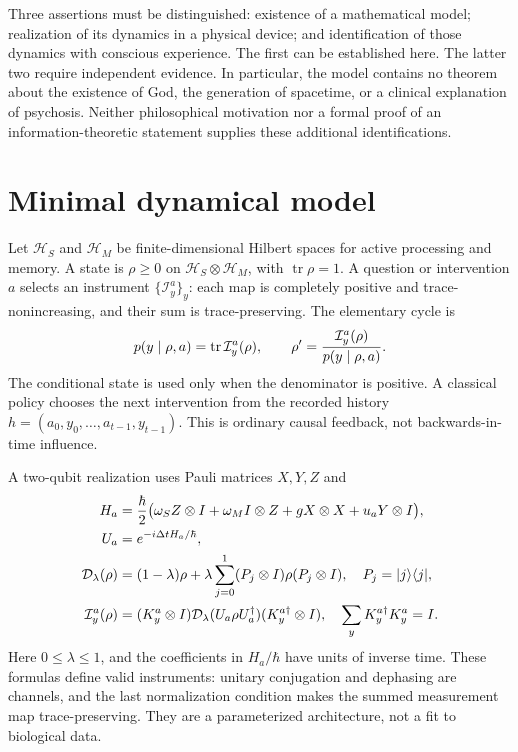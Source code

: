 \documentclass[11pt,a4paper]{article}
\theoremstyle{definition}
\newcommand{\tr}{\operatorname{tr}}
\newcommand{\ket}[1]{|#1\rangle}
\newcommand{\bra}[1]{\langle#1|}
\begin{document}
Three assertions must be distinguished: existence of a mathematical model; realization of its dynamics in a physical device; and identification of those dynamics with conscious experience. The first can be established here. The latter two require independent evidence. In particular, the model contains no theorem about the existence of God, the generation of spacetime, or a clinical explanation of psychosis. Neither philosophical motivation nor a formal proof of an information-theoretic statement supplies these additional identifications.

\section{Minimal dynamical model}
Let $\mathcal H_S$ and $\mathcal H_M$ be finite-dimensional Hilbert spaces for active processing and memory. A state is $\rho\ge0$ on $\mathcal H_S\otimes\mathcal H_M$, with $\tr\rho=1$. A question or intervention $a$ selects an instrument $\{\mathcal I_y^a\}_y$: each map is completely positive and trace-nonincreasing, and their sum is trace-preserving. The elementary cycle is
\begin{equation}\label{eq:cycle}
 p(y\mid\rho,a)=\tr\mathcal I_y^a(\rho),\qquad
 \rho'={\mathcal I_y^a(\rho)\over p(y\mid\rho,a)}.
\end{equation}
The conditional state is used only when the denominator is positive. A classical policy chooses the next intervention from the recorded history $h=(a_0,y_0,\ldots,a_{t-1},y_{t-1})$. This is ordinary causal feedback, not backwards-in-time influence.

A two-qubit realization uses Pauli matrices $X,Y,Z$ and
\begin{align}
 H_a&={\hbar\over2}\bigl(\omega_S Z\otimes I+\omega_M I\otimes Z
       +gX\otimes X+u_aY\otimes I\bigr),\\
 U_a&=e^{-i\Delta t H_a/\hbar},\\
 \mathcal D_\lambda(\rho)&=(1-\lambda)\rho+
 \lambda\sum_{j=0}^1(P_j\otimes I)\rho(P_j\otimes I),\quad
 P_j=\ket j\bra j,\\
 \mathcal I_y^a(\rho)&=(K_y^a\otimes I)\mathcal D_\lambda(U_a\rho U_a^\dagger)
 (K_y^{a\dagger}\otimes I),\quad
 \sum_yK_y^{a\dagger}K_y^a=I.
\end{align}
Here $0\le\lambda\le1$, and the coefficients in $H_a/\hbar$ have units of inverse time. These formulas define valid instruments: unitary conjugation and dephasing are channels, and the last normalization condition makes the summed measurement map trace-preserving. They are a parameterized architecture, not a fit to biological data.
\end{document}
